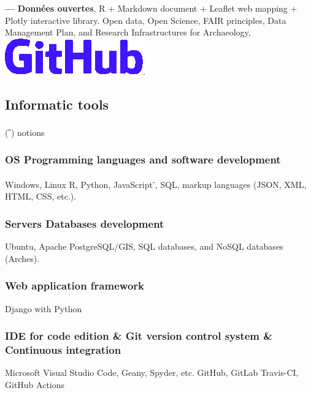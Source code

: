 \documentclass{article}
\begin{document}
\smallbreak
\textbf{--- }\textbf{Donn\'{e}es ouvertes}, \textsf{R} + \textsf{Markdown} document + \textsf{Leaflet} web mapping + \textsf{Plotly} interactive library. Open data, Open Science, FAIR principles, Data Management Plan, and Research Infrastructures for Archaeology, \href{https://zoometh.github.io/LOD}{\includegraphics[scale=0.1]{github-rect.png}}.

\subsection*{Informatic tools}
\begin{center}(\textbf{\textsuperscript{-}}) notions \end{center}
\smallbreak

\subsubsection*{OS {\textbar} Programming languages and software development}

Windows, Linux \textbf{{\textbar}} \textsf{R}, \textsf{Python}, \textsf{JavaScript\textsuperscript{-}}, SQL, markup languages (JSON, XML, HTML, CSS, etc.).

\subsubsection*{Servers {\textbar} Databases development} 

Ubuntu, Apache \textbf{{\textbar}} PostgreSQL/GIS, SQL databases, and NoSQL databases (Arches).

\subsubsection*{Web application framework} 

\textsf{Django} with \textsf{Python}

\subsubsection*{IDE for code edition \& Git version control system \& Continuous integration} 

Microsoft Visual Studio Code, Geany, Spyder, etc. \textbf{{\textbar}} GitHub, GitLab \textbf{{\textbar}} Travis-CI, GitHub Actions
\end{document}
